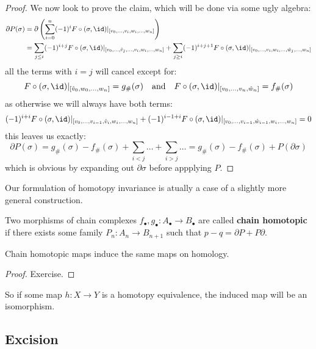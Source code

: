 \documentclass[a4paper]{article}
\begin{document}
\begin{theorem}
\begin{proof}
We now look to prove the claim, which will be done via some ugly algebra:\begin{align*}
    \partial P(\sigma) &= \partial\pr{\sum_{i=0}^n (-1)^i F\circ(\sigma,\id)\vert_{[v_0,\ldots,v_i,w_i,\ldots,w_n]}} \\
    &= \sum_{j\leq i} (-1)^{i+j } F\circ(\sigma,\id)\vert_{[v_0,\ldots,\hat{v}_j,\ldots,v_i,w_i,\ldots,w_n]} + 
    \sum_{j\geq i} (-1)^{i+j+1} F\circ(\sigma,\id)\vert_{[v_0,\ldots,v_i,w_i,\ldots,\hat{w}_j,\ldots,w_n]}
\end{align*}
all the terms with $i=j$ will cancel except for:\[
    F\circ(\sigma,\id)\vert_{[\hat{v}_0,w_0,\ldots,w_n]} =g_\#(\sigma)
    \quad \text{and} \quad 
    F\circ(\sigma,\id)\vert_{[v_0,\ldots,v_n,\hat{w}_n]} = f_\#(\sigma)
\]
as otherwise we will always have both terms:\[
    (-1)^{i+i}F\circ(\sigma,\id)\vert_{[v_0,\ldots,v_{i-1},\hat{v}_i,w_i,\ldots,w_n]} + 
    (-1)^{i-1+i}F\circ(\sigma,\id)\vert_{[v_0,\ldots,v_{i-1},\hat{w}_{i-1},w_i,\ldots,w_n]} = 0
\]
this leaves us exactly:\[
    \partial P(\sigma) = g_\#(\sigma) - f_\#(\sigma) + \sum_{i<j}\ldots + \sum_{i>j}\ldots = g_\#(\sigma)-f_\#(\sigma) + P(\partial \sigma)
\]
which is obvious by expanding out $\partial \sigma$ before appplying $P$.
\end{proof}
\end{theorem}
Our formulation of homotopy invariance is atually a case of a slightly more general construction.
\begin{definition}
    Two morphisms of chain complexes $f_\bullet,g_\bullet:A_\bullet\rightarrow B_\bullet$ are called \textbf{chain homotopic} if there exists some family $P_n:A_n\rightarrow B_{n+1}$ such that $p-q = \partial P + P\partial$. %
\end{definition}
\begin{proposition}
    Chain homotopic maps induce the same maps on homology.
    \begin{proof}
        Exercise.
    \end{proof}
\end{proposition}
So if some map $h:X\rightarrow Y$ is a homotopy equivalence, the induced map will be an isomorphism.


\subsection{Excision}
\end{document}
